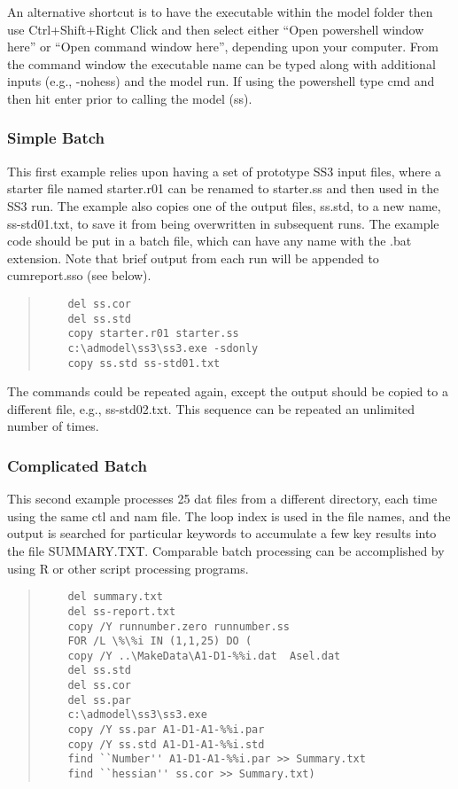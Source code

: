 An alternative shortcut is to have the executable within the model folder then use Ctrl+Shift+Right Click and then select either ``Open powershell window here'' or ``Open command window here'', depending upon your computer. From the command window the executable name can be typed along with additional inputs (e.g., -nohess) and the model run. If using the powershell type cmd and then hit enter prior to calling the model (ss). 


\subsubsection{Simple Batch}

This first example relies upon having a set of prototype SS3 input files, where a starter file named starter.r01 can be renamed to starter.ss and then used in the SS3 run. The example also copies one of the output files, ss.std, to a new name, ss-std01.txt, to save it from being overwritten in subsequent runs. The example code should be put in a batch file, which can have any name with the .bat extension. Note that brief output from each run will be appended to cumreport.sso (see below).

\begin{quote}
	\begin{verbatim}
	del ss.cor
	del ss.std
	copy starter.r01 starter.ss
	c:\admodel\ss3\ss3.exe -sdonly
	copy ss.std ss-std01.txt
	\end{verbatim}
\end{quote}

The commands could be repeated again, except the output should be copied to a different file, e.g., ss-std02.txt. This sequence can be repeated an unlimited number of times.

\subsubsection{Complicated Batch}
This second example processes 25 dat files from a different directory, each time using the same ctl and nam file.  The loop index is used in the file names, and the output is searched for particular keywords to accumulate a few key results into the file SUMMARY.TXT.  Comparable batch processing can be accomplished by using R or other script processing programs.

\begin{quote}
	\begin{verbatim}
	del summary.txt
	del ss-report.txt
	copy /Y runnumber.zero runnumber.ss
	FOR /L \%\%i IN (1,1,25) DO (
	copy /Y ..\MakeData\A1-D1-%%i.dat  Asel.dat
	del ss.std
	del ss.cor
	del ss.par
	c:\admodel\ss3\ss3.exe
	copy /Y ss.par A1-D1-A1-%%i.par
	copy /Y ss.std A1-D1-A1-%%i.std
	find ``Number'' A1-D1-A1-%%i.par >> Summary.txt
	find ``hessian'' ss.cor >> Summary.txt)
	\end{verbatim}
\end{quote}


